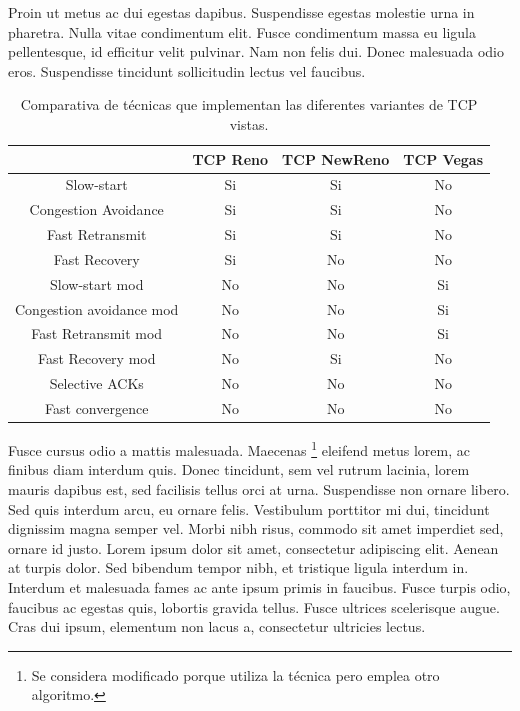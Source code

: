 Proin ut metus ac dui egestas dapibus. Suspendisse egestas molestie urna in pharetra. Nulla vitae condimentum elit. Fusce condimentum massa eu ligula pellentesque, id efficitur velit pulvinar. Nam non felis dui. Donec malesuada odio eros. Suspendisse tincidunt sollicitudin lectus vel faucibus.

\begin{table}[!ht]
	\begin{centering}
		\begin{tabular}{c|c|c|c}
 & TCP Reno & TCP NewReno & TCP Vegas \\ 
\hline  
Slow-start & Si & Si & No\\ 
 
Congestion Avoidance & Si & Si  & No\\ 
 
Fast Retransmit & Si & Si & No \\ 
 
Fast Recovery & Si & No & No \\ 
 
Slow-start mod & No & No & Si  \\ 
 
Congestion avoidance mod & No & No & Si \\ 
 
Fast Retransmit mod & No & No & Si\\ 
 
Fast Recovery mod & No & Si & No \\ 
 
Selective ACKs & No & No & No\\ 
 
Fast convergence & No & No & No \\ 
 
\end{tabular} 
	\caption{Comparativa de técnicas que implementan las diferentes variantes de TCP vistas.}
		\label{tab:comparativa-tecnicas}
	\end{centering}
\end{table}

Fusce cursus odio a mattis malesuada. Maecenas \footnote{Se considera modificado porque utiliza la técnica pero emplea otro algoritmo.} eleifend metus lorem, ac finibus diam interdum quis. Donec tincidunt, sem vel rutrum lacinia, lorem mauris dapibus est, sed facilisis tellus orci at urna. Suspendisse non ornare libero. Sed quis interdum arcu, eu ornare felis. Vestibulum porttitor mi dui, tincidunt dignissim magna semper vel. Morbi nibh risus, commodo sit amet imperdiet sed, ornare id justo. Lorem ipsum dolor sit amet, consectetur adipiscing elit. Aenean at turpis dolor. Sed bibendum tempor nibh, et tristique ligula interdum in. Interdum et malesuada fames ac ante ipsum primis in faucibus. Fusce turpis odio, faucibus ac egestas quis, lobortis gravida tellus. Fusce ultrices scelerisque augue. Cras dui ipsum, elementum non lacus a, consectetur ultricies lectus.

